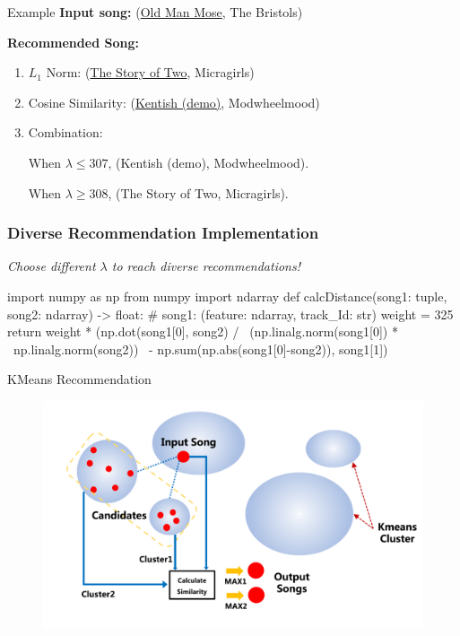 \documentclass{beamer}
\begin{document}
\begin{frame}{Example}
    \textbf{Input song:} (\href{https://music.163.com/#/song?id=1328484856}{Old Man Mose}, The Bristols)

    \bigskip
    \textbf{Recommended Song:}
    \begin{enumerate}
        \item $L_1$ Norm: (\href{https://music.163.com/#/song?id=553931121}{The Story of Two}, Micragirls)
        \item Cosine Similarity: (\href{https://music.163.com/#/song?id=1880855685}{Kentish (demo)}, Modwheelmood) 
        \item Combination:

        When $\lambda \leq 307$, (Kentish (demo), Modwheelmood).

        When $\lambda \geq 308$, (The Story of Two, Micragirls).
        
    \end{enumerate}
\vspace{0.35cm}
\end{frame}

\begin{frame}[fragile]

\frametitle{Diverse Recommendation Implementation}
\textit{Choose different $\lambda$ to reach diverse recommendations!}
\begin{mycodetiny}
import numpy as np
from numpy import ndarray
def calcDistance(song1: tuple, song2: ndarray) -> float:
    # song1: (feature: ndarray, track_Id: str)
    weight = 325
    return weight * (np.dot(song1[0], song2) / \ 
           (np.linalg.norm(song1[0]) * \ 
           np.linalg.norm(song2)) \ 
           - np.sum(np.abs(song1[0]-song2)), song1[1])

\end{mycodetiny}

\end{frame}


\begin{frame}{KMeans Recommendation}
\begin{figure}
    \centering
    \includegraphics[width=0.9\linewidth]{img/Kmean.png}
    \label{fig:kmeans}
\end{figure}

\end{frame}
\end{document}
